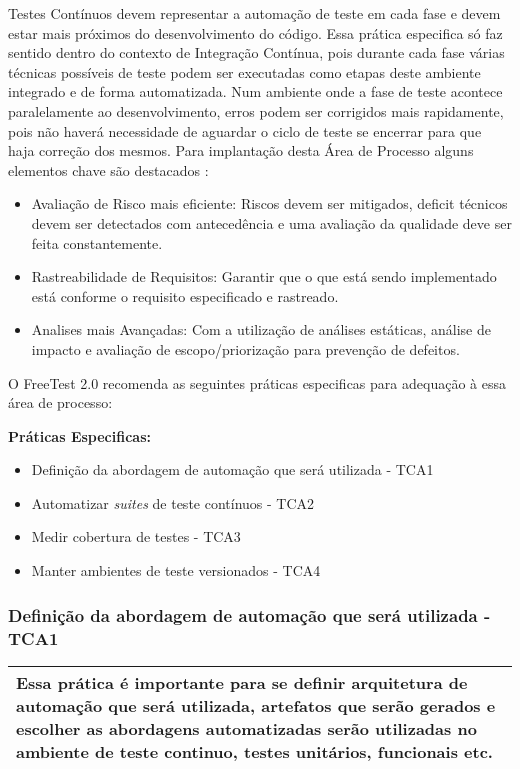 Testes Contínuos devem representar a automação de teste em cada fase e devem estar mais próximos do desenvolvimento do código. Essa prática especifica só faz sentido dentro do contexto de Integração Contínua, pois durante cada fase várias técnicas possíveis de teste podem ser executadas como etapas deste ambiente integrado e de forma automatizada. Num ambiente onde a fase de teste acontece paralelamente ao desenvolvimento, erros podem ser corrigidos mais rapidamente, pois não haverá necessidade de aguardar o ciclo de teste se encerrar para que haja correção dos mesmos. Para implantação desta Área de Processo alguns elementos chave são destacados \cite{ContinuousTestIT}:

\begin{itemize}
	\item Avaliação de Risco mais eficiente: Riscos devem ser mitigados, deficit técnicos devem ser detectados com antecedência e uma avaliação da qualidade deve ser feita constantemente.  
	\item Rastreabilidade de Requisitos: Garantir que o que está sendo implementado está conforme o requisito especificado e rastreado.
	\item Analises mais Avançadas: Com a utilização de análises estáticas, análise de impacto e avaliação de escopo/priorização para prevenção de defeitos.
\end{itemize}


O FreeTest 2.0 recomenda as seguintes práticas especificas para adequação à essa área de processo:

\textbf{Práticas Especificas:}

\begin{itemize}    
    \item Definição da abordagem de automação que será utilizada - TCA1
    \item Automatizar \textit{suites} de teste contínuos - TCA2
    \item Medir cobertura de testes - TCA3
    \item Manter ambientes de teste versionados - TCA4
\end{itemize}

\subsubsection{Definição da abordagem de automação que será utilizada - TCA1}
\label{sec:tca1}

\begin{table}[H]
\centering
\begin{tabular}{|p{130mm}|}
\hline
Essa prática é importante para se definir arquitetura de automação que será utilizada, artefatos que serão gerados e escolher as abordagens automatizadas serão utilizadas no ambiente de teste continuo, testes unitários, funcionais etc. \\ 
\hline
\end{tabular}
\end{table}

